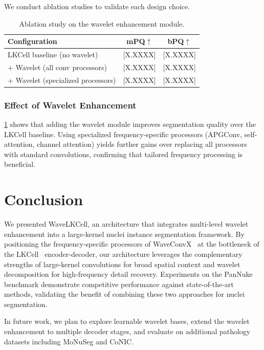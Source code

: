 \documentclass[conference]{IEEEtran}
\begin{document}
We conduct ablation studies to validate each design choice.

\begin{table}[t]
\centering
\caption{Ablation study on the wavelet enhancement module.}
\label{tab:ablation_wavelet}
\begin{tabular}{lcc}
\toprule
\textbf{Configuration} & \textbf{mPQ}$\uparrow$ & \textbf{bPQ}$\uparrow$ \\
\midrule
LKCell baseline (no wavelet) & [X.XXXX] & [X.XXXX] \\
+ Wavelet (all conv processors) & [X.XXXX] & [X.XXXX] \\
+ Wavelet (specialized processors) & [X.XXXX] & [X.XXXX] \\
\bottomrule
\end{tabular}
\end{table}

\subsubsection{Effect of Wavelet Enhancement}

\cref{tab:ablation_wavelet} shows that adding the wavelet module improves segmentation quality over the LKCell baseline. Using specialized frequency-specific processors (APGConv, self-attention, channel attention) yields further gains over replacing all processors with standard convolutions, confirming that tailored frequency processing is beneficial.

\section{Conclusion}
\label{sec:conclusion}

We presented WaveLKCell, an architecture that integrates multi-level wavelet enhancement into a large-kernel nuclei instance segmentation framework. By positioning the frequency-specific processors of WaveConvX~\cite{waveconvx} at the bottleneck of the LKCell~\cite{lkcell} encoder-decoder, our architecture leverages the complementary strengths of large-kernel convolutions for broad spatial context and wavelet decomposition for high-frequency detail recovery. Experiments on the PanNuke benchmark demonstrate competitive performance against state-of-the-art methods, validating the benefit of combining these two approaches for nuclei segmentation.

In future work, we plan to explore learnable wavelet bases, extend the wavelet enhancement to multiple decoder stages, and evaluate on additional pathology datasets including MoNuSeg and CoNIC.




\end{document}
